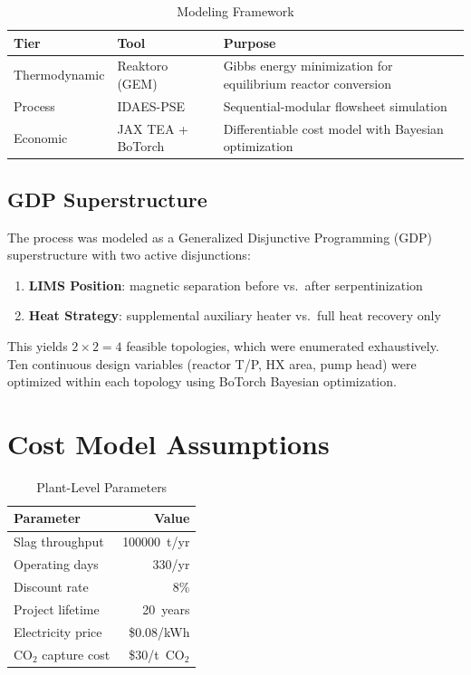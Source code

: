 \documentclass[11pt,a4paper]{article}
\begin{document}
\begin{table}[H]
\centering
\caption{Modeling Framework}
\label{tab:modeling}
\begin{tabular}{@{}llp{6cm}@{}}
\toprule
\textbf{Tier} & \textbf{Tool} & \textbf{Purpose} \\
\midrule
Thermodynamic & Reaktoro (GEM) & Gibbs energy minimization for equilibrium reactor conversion \\
Process & IDAES-PSE & Sequential-modular flowsheet simulation \\
Economic & JAX TEA + BoTorch & Differentiable cost model with Bayesian optimization \\
\bottomrule
\end{tabular}
\end{table}

\subsection{GDP Superstructure}

The process was modeled as a Generalized Disjunctive Programming (GDP)
superstructure with two active disjunctions:
\begin{enumerate}[nosep]
  \item \textbf{LIMS Position}: magnetic separation before vs.\ after serpentinization
  \item \textbf{Heat Strategy}: supplemental auxiliary heater vs.\ full heat recovery only
\end{enumerate}
This yields $2 \times 2 = 4$ feasible topologies, which were enumerated exhaustively.
Ten continuous design variables (reactor T/P, HX area, pump head) were
optimized within each topology using BoTorch Bayesian optimization.

\section{Cost Model Assumptions}

\begin{table}[H]
\centering
\caption{Plant-Level Parameters}
\label{tab:plant}
\begin{tabular}{@{}lr@{}}
\toprule
\textbf{Parameter} & \textbf{Value} \\
\midrule
Slag throughput & \num{100000}~t/yr \\
Operating days & 330/yr \\
Discount rate & 8\% \\
Project lifetime & 20~years \\
Electricity price & \$0.08/kWh \\
CO$_2$ capture cost & \$30/t~CO$_2$ \\
\bottomrule
\end{tabular}
\end{table}
\end{document}
